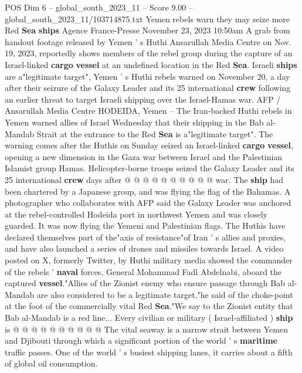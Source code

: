 \begin{textsample}{POS Dim 6 – global\_south\_2023\_11 – Score 9.00 – global\_south\_2023\_11/103714875.txt}  \label{ex:f6_pos_301}
Yemen rebels warn they may seize more Red \textbf{Sea} \textbf{ships} Agence France-Presse November 23, 2023 10:50am A grab from handout footage released by Yemen ' s Huthi Ansarullah Media Centre on Nov. 19, 2023, reportedly shows members of the rebel group during the capture of an Israel-linked \textbf{cargo} \textbf{vessel} at an undefined location in the Red \textbf{Sea}.
Israeli \textbf{ships} are a"legitimate target", Yemen ' s Huthi rebels warned on November 20, a day after their seizure of the Galaxy Leader and its 25 international \textbf{crew} following an earlier threat to target Israeli shipping over the Israel-Hamas war.
AFP / Ansarullah Media Centre HODEIDA, Yemen -- The Iran-backed Huthi rebels in Yemen warned allies of Israel Wednesday that their shipping in the Bab al-Mandab Strait at the entrance to the Red \textbf{Sea} is a"legitimate target".
The warning comes after the Huthis on Sunday seized an Israel-linked \textbf{cargo} \textbf{vessel}, opening a new dimension in the Gaza war between Israel and the Palestinian Islamist group Hamas.
Helicopter-borne troops seized the Galaxy Leader and its 25 international \textbf{crew} days after @ @ @ @ @ @ @ @ @ @ war.
The \textbf{ship} had been chartered by a Japanese group, and was flying the flag of the Bahamas.
A photographer who collaborates with AFP said the Galaxy Leader was anchored at the rebel-controlled Hodeida port in northwest Yemen and was closely guarded.
It was now flying the Yemeni and Palestinian flags.
The Huthis have declared themselves part of the"axis of resistance"of Iran ' s allies and proxies, and have also launched a series of drones and missiles towards Israel.
A video posted on X, formerly Twitter, by Huthi military media showed the commander of the rebels ' \textbf{naval} forces, General Mohammad Fadl Abdelnabi, aboard the captured \textbf{vessel}."Allies of the Zionist enemy who ensure passage through Bab al-Mandab are also considered to be a legitimate target,"he said of the choke-point at the foot of the commercially vital Red \textbf{Sea}."We say to the Zionist entity that Bab al-Mandab is a red line...
Every civilian or military ( Israel-affiliated ) \textbf{ship} is @ @ @ @ @ @ @ @ @ @ The vital seaway is a narrow strait between Yemen and Djibouti through which a significant portion of the world ' s \textbf{maritime} traffic passes.
One of the world ' s busiest shipping lanes, it carries about a fifth of global oil consumption.

\end{textsample}
